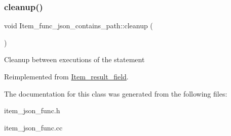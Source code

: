 \subsubsection{\texorpdfstring{cleanup()}{cleanup()}}
{\footnotesize\ttfamily void Item\+\_\+func\+\_\+json\+\_\+contains\+\_\+path\+::cleanup (\begin{DoxyParamCaption}{ }\end{DoxyParamCaption})\hspace{0.3cm}{\ttfamily [virtual]}}

Cleanup between executions of the statement 

Reimplemented from \mbox{\hyperlink{classItem__result__field}{Item\+\_\+result\+\_\+field}}.



The documentation for this class was generated from the following files\+:\begin{DoxyCompactItemize}
\item 
item\+\_\+json\+\_\+func.\+h\item 
item\+\_\+json\+\_\+func.\+cc\end{DoxyCompactItemize}
